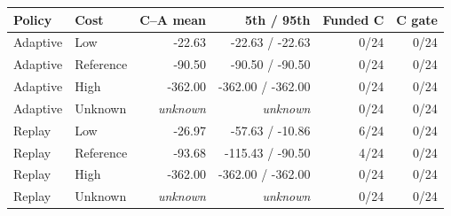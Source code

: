 \begin{tabularx}{\linewidth}{YYrrrr}
\toprule Policy & Cost & C--A mean & 5th / 95th & Funded C & C gate \\
\midrule
Adaptive & Low & -22.63 & -22.63 / -22.63 & 0/24 & 0/24 \\
Adaptive & Reference & -90.50 & -90.50 / -90.50 & 0/24 & 0/24 \\
Adaptive & High & -362.00 & -362.00 / -362.00 & 0/24 & 0/24 \\
Adaptive & Unknown & \textit{unknown} & \textit{unknown} & 0/24 & 0/24 \\
Replay & Low & -26.97 & -57.63 / -10.86 & 6/24 & 0/24 \\
Replay & Reference & -93.68 & -115.43 / -90.50 & 4/24 & 0/24 \\
Replay & High & -362.00 & -362.00 / -362.00 & 0/24 & 0/24 \\
Replay & Unknown & \textit{unknown} & \textit{unknown} & 0/24 & 0/24 \\
\bottomrule
\end{tabularx}
